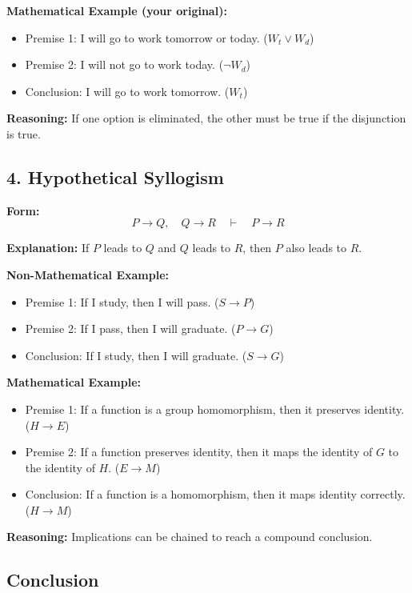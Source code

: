 \documentclass[10pt]{article}
\theoremstyle{plain}
\theoremstyle{definition}
\begin{document}
  \textbf{Mathematical Example (your original):}
  \begin{itemize}
  	\item Premise 1: I will go to work tomorrow or today. ($W_t \lor W_d$)
  	\item Premise 2: I will not go to work today. ($\lnot W_d$)
  	\item Conclusion: I will go to work tomorrow. ($W_t$)
  \end{itemize}
  
  \textbf{Reasoning:}  
  If one option is eliminated, the other must be true if the disjunction is true.
  
  \subsection*{4. Hypothetical Syllogism}
  
  \textbf{Form:}
  \[
  P \rightarrow Q,\quad Q \rightarrow R \quad \vdash \quad P \rightarrow R
  \]
  
  \textbf{Explanation:}  
  If $P$ leads to $Q$ and $Q$ leads to $R$, then $P$ also leads to $R$.
  
  \textbf{Non-Mathematical Example:}
  \begin{itemize}
  	\item Premise 1: If I study, then I will pass. ($S \rightarrow P$)
  	\item Premise 2: If I pass, then I will graduate. ($P \rightarrow G$)
  	\item Conclusion: If I study, then I will graduate. ($S \rightarrow G$)
  \end{itemize}
  
  \textbf{Mathematical Example:}
  \begin{itemize}
  	\item Premise 1: If a function is a group homomorphism, then it preserves identity. ($H \rightarrow E$)
  	\item Premise 2: If a function preserves identity, then it maps the identity of $G$ to the identity of $H$. ($E \rightarrow M$)
  	\item Conclusion: If a function is a homomorphism, then it maps identity correctly. ($H \rightarrow M$)
  \end{itemize}
  
  \textbf{Reasoning:}  
  Implications can be chained to reach a compound conclusion.
  
  \subsection*{Conclusion}
  
\end{document}

